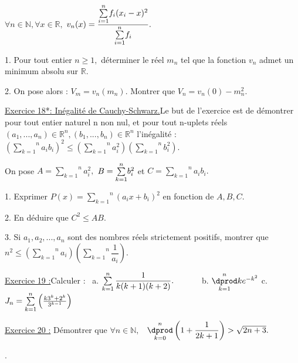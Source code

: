 \documentclass{article}
\begin{document}
$\forall n\in 
\mathbb{N}
,\forall x\in 
\mathbb{R}
,$ $v_{n}(x)=\dfrac{\overset{n}{\underset{i=1}{\sum }}f_{i}(x_{i}-x)^{2}}{%
\overset{n}{\underset{i=1}{\sum }}f_{i}}.$

1. Pour tout entier $n\geq 1,$ d\'{e}terminer le r\'{e}el $m_{n}$ tel que la
fonction $v_{n}$ admet un minimum absolu sur $%
\mathbb{R}
.$

2. On pose alors : $V_{m}=v_{n}(m_{n}).$ Montrer que $%
V_{n}=v_{n}(0)-m_{n}^{2}.$

\underline{Exercice 18*: In\'{e}galit\'{e} de Cauchy-Schwarz.}Le but de
l'exercice est de d\'{e}montrer pour tout entier naturel n non nul, et pour
tout n-uplets r\'{e}els $(a_{1},...,a_{n})\in 
\mathbb{R}
^{n},(b_{1},...,b_{n})\in 
\mathbb{R}
^{n}$ l'in\'{e}galit\'{e} : $\left( \overset{n}{\underset{k=1}{\sum }}%
a_{i}b_{i}\right) ^{2}\leq \left( \overset{n}{\underset{k=1}{\sum }}%
a_{i}^{2}\right) \left( \overset{n}{\underset{k=1}{\sum }}b_{i}^{2}\right) .$

On pose $A=\overset{n}{\underset{k=1}{\sum }}a_{i}^{2},$ $B=\overset{n}{%
\underset{k=1}{\sum }}b_{i}^{2}$ et $C=\overset{n}{\underset{k=1}{\sum }}%
a_{i}b_{i}.$

1. Exprimer $P(x)=\overset{n}{\underset{k=1}{\sum }}\left(
a_{i}x+b_{i}\right) ^{2}$ en fonction de $A,B,C.$

2. En d\'{e}duire que $C^{2}\leq AB.$

3. Si $a_{1},a_{2},...,a_{n}$ sont des nombres r\'{e}els strictement
positifs, montrer que $n^{2}\leq \left( \overset{n}{\underset{k=1}{\sum }}%
a_{i}\right) \left( \overset{n}{\underset{k=1}{\sum }}\dfrac{1}{a_{i}}%
\right) .$

\underline{Exercice 19 :}Calculer : \ a. $\sum\limits_{k=1}^{n}\dfrac{1}{%
k(k+1)(k+2)}.$ \ \ \ \ \ \ b. $\overset{n}{\underset{k=1}{\dprod }}%
ke^{-k^{2}}$ c. $J_{n}=\overset{n}{\underset{k=1}{\sum }}\left( \frac{%
k3^{k}+2^{k}}{3^{k-1}}\right) $

\underline{Exercice 20 :} D\'{e}montrer que $\forall n\in 
\mathbb{N}
,$ \ $\overset{n}{\underset{k=0}{\dprod }}\left( 1+\dfrac{1}{2k+1}\right) >%
\sqrt{2n+3}.$

\bigskip

\bigskip

\bigskip

\qquad

\bigskip

.
\end{document}
